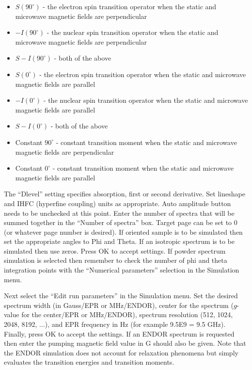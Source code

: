 \documentclass[byrevtex,amssymb,aps,pra,floatfix,letterpaper]{revtex4}
\begin{document}
\begin{itemize}
\item $S (90^\circ)$ - the electron spin transition operator when the static and microwave magnetic fields are perpendicular
\item $-I (90^\circ)$ - the nuclear spin transition operator when the static and microwave magnetic fields are perpendicular
\item $S - I (90^\circ)$ - both of the above
\item $S (0^\circ)$ - the electron spin transition operator when the static and microwave magnetic fields are parallel
\item $-I (0^\circ)$ - the nuclear spin transition operator when the static and microwave magnetic fields are parallel
\item $S - I (0^\circ)$ - both of the above
\item Constant $90^\circ$ - constant transition moment when the static and microwave magnetic fields are perpendicular
\item Constant $0^\circ$ - constant transition moment when the static and microwave magnetic fields are parallel
\end{itemize}

\noindent
The ``Dlevel'' setting specifies absorption, first or second derivative. Set lineshape and IHFC (hyperfine coupling) units as appropriate. Auto amplitude button needs to be unchecked at this point. Enter the number of spectra that will be summed together in the ``Number of spectra'' box. Target page can be set to 0 (or whatever page number is desired). If oriented sample is to be simulated then set the appropriate angles to Phi and Theta. If an isotropic spectrum is to be simulated then use zeros. Press OK to accept settings. If powder spectrum simulation is selected then remember to check the number of phi and theta integration points with the ``Numerical parameters'' selection in the Simulation menu.

Next select the ``Edit run parameters'' in the Simulation menu. Set the desired spectrum width (in Gauss/EPR or MHz/ENDOR), center for the spectrum ($g$-value for the center/EPR or MHz/ENDOR), spectrum resolution (512, 1024, 2048, 8192, ...), and EPR frequency in Hz (for example 9.5E9 = 9.5 GHz). Finally,
press OK to accept the settings. If an ENDOR spectrum is requested then enter the pumping magnetic field value in G should also be given. Note that the ENDOR simulation does not account for relaxation phenomena but simply evaluates the transition energies and transition moments.
\end{document}
